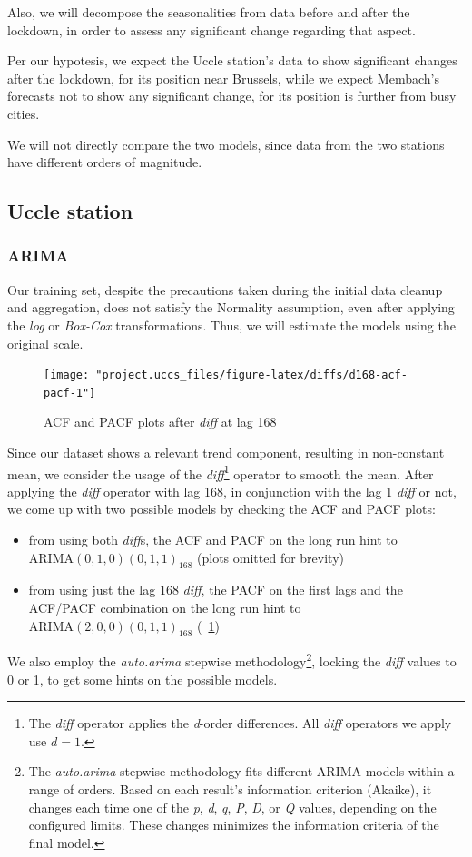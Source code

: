 \documentclass[12pt]{article}
\begin{document}
Also, we will decompose the seasonalities from data before and after the lockdown, in order to assess any significant change regarding that aspect.

Per our hypotesis, we expect the Uccle station's data to show significant changes after the lockdown, for its position near Brussels, while we expect Membach's forecasts not to show any significant change, for its position is further from busy cities.

We will not directly compare the two models, since data from the two stations have different orders of magnitude.

\subsection{Uccle station}
\subsubsection{ARIMA}
Our training set, despite the precautions taken during the initial data cleanup and aggregation, does not satisfy the Normality assumption, even after applying the \textit{log} or \textit{Box-Cox} transformations. Thus, we will estimate the models using the original scale.

\begin{figure}[h]
	\centering
	\texttt{[image: "project.uccs\_files/figure-latex/diffs/d168-acf-pacf-1"]}
	\caption{ACF and PACF plots after \textit{diff} at lag 168}
	\label{fig:uccs:p-acf}
\end{figure}
%
Since our dataset shows a relevant trend component, resulting in non-constant mean, we consider the usage of the \textit{diff}\footnote{The \textit{diff} operator applies the \textit{d}-order differences. All \textit{diff} operators we apply use $d=1$.} operator to smooth the mean.
After applying the \textit{diff} operator with lag 168, in conjunction with the lag 1 \textit{diff} or not, we come up with two possible models by checking the ACF and PACF plots:
\begin{itemize}[topsep=0.5em,itemsep=0em,partopsep=0.5em]
	\item from using both \textit{diff}s, the ACF and PACF on the long run hint to $\mathrm{ARIMA}(0,1,0)(0,1,1)_{168}$ (plots omitted for brevity)
	\item from using just the lag 168 \textit{diff}, the PACF on the first lags and the ACF/PACF combination on the long run hint to $\mathrm{ARIMA}(2,0,0)(0,1,1)_{168}$ (\figurename~\ref{fig:uccs:p-acf})
\end{itemize}
We also employ the \textit{auto.arima} stepwise methodology\footnote{\label{footnote:auto.arima}The \textit{auto.arima} stepwise methodology fits different ARIMA models within a range of orders. Based on each result's information criterion (Akaike), it changes each time one of the \textit{p}, \textit{d}, \textit{q}, \textit{P}, \textit{D}, or \textit{Q} values, depending on the configured limits. These changes minimizes the information criteria of the final model.}, locking the \textit{diff} values to 0 or 1, to get some hints on the possible models.
\end{document}
